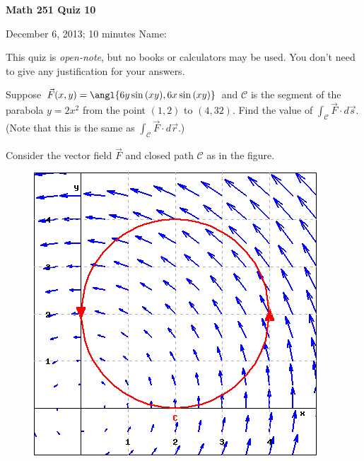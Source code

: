\documentclass[12pt]{exam}
\begin{document}
\noindent
\textbf{{\large Math 251 \hfill Quiz 10}}

\noindent
December 6, 2013; 10 minutes \hfill Name: \underline{\hspace{3in}} 

\noindent

\noindent
This quiz is \emph{open-note}, but no books or calculators may be used.
You don't need to give any justification for your answers.

\begin{questions} 

    \question[6] Suppose $\vec{F}(x,y) = \angl{6y \sin{(xy)}, 6x \sin{(xy)}}$ and $\mathcal{C}$ is the segment of the parabola $y = 2x^2$ from the point $(1,2)$ to $(4,32)$. Find the value of  $\int_{\mathcal{C}} \vec{F} \cdot d\vec{s}$. (Note that this is the same as $\int_{\mathcal{C}} \vec{F} \cdot d\vec{r}$.)


    \question Consider the vector field $\vec{F}$ and closed path $\mathcal{C}$ as in the figure.
    \begin{figure}[ht]
        \begin{minipage}[t]{0.4\textwidth}
            \vspace{0pt}
            \includegraphics[width=\linewidth,height=\linewidth]{images/image.png}
        \end{minipage} \hspace{1em}
        \begin{minipage}[t]{0.4\textwidth}
            \vspace{0pt}
            \begin{parts}

\end{parts}
\end{minipage}
\end{figure}
\end{questions}
\end{document}
